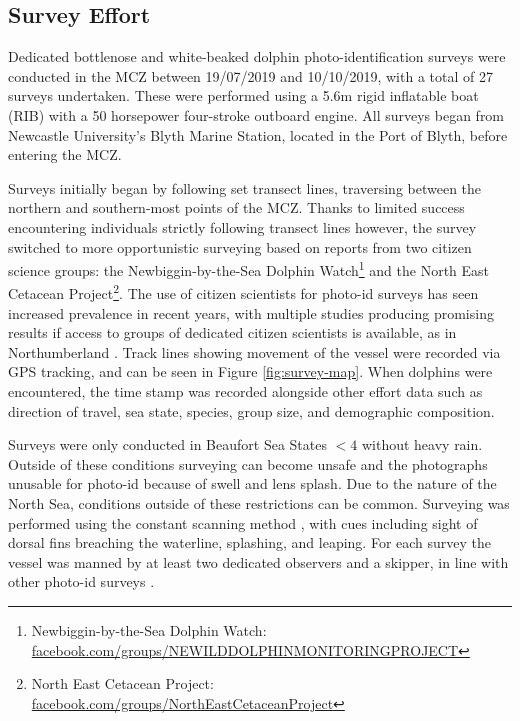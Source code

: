 \subsection{Survey Effort}\label{ch:NDD,sec:dataCollection,sub:surveyEffort}

Dedicated bottlenose and white-beaked dolphin photo-identification surveys were conducted in the MCZ between 19/07/2019 and 10/10/2019, with a total of 27 surveys undertaken. These were performed using a 5.6m rigid inflatable boat (RIB) with a 50 horsepower four-stroke outboard engine. All surveys began from Newcastle University's Blyth Marine Station, located in the Port of Blyth, before entering the MCZ.

Surveys initially began by following set transect lines, traversing between the northern and southern-most points of the MCZ. Thanks to limited success encountering individuals strictly following transect lines however, the survey switched to more opportunistic surveying based on reports from two citizen science groups: the Newbiggin-by-the-Sea Dolphin Watch\footnote{Newbiggin-by-the-Sea Dolphin Watch: \href{https://en-gb.facebook.com/groups/NEWILDDOLPHINMONITORINGPROJECT/}{facebook.com/groups/NEWILDDOLPHINMONITORINGPROJECT}} and the North East Cetacean Project\footnote{North East Cetacean Project: \href{https://en-gb.facebook.com/groups/NorthEastCetaceanProject/about/}{facebook.com/groups/NorthEastCetaceanProject}}. The use of citizen scientists for photo-id surveys has seen increased prevalence in recent years, with multiple studies producing promising results if access to groups of dedicated citizen scientists is available, as in Northumberland \cite{araujo_population_2017, currie_conservation_2018, armstrong_photographic_2019, araujo_photo-id_2019}. Track lines showing movement of the vessel were recorded via GPS tracking, and can be seen in Figure \ref{fig:survey-map}. When dolphins were encountered, the time stamp was recorded alongside other effort data such as direction of travel, sea state, species, group size, and demographic composition.

Surveys were only conducted in Beaufort Sea States $<4$ \cite{world_meteorologicial_society_beaufort_1970} without heavy rain. Outside of these conditions surveying can become unsafe and the photographs unusable for photo-id because of swell and lens splash. Due to the nature of the North Sea, conditions outside of these restrictions can be common. Surveying was performed using the constant scanning method \cite{mann_behavioral_1999}, with cues including sight of dorsal fins breaching the waterline, splashing, and leaping. For each survey the vessel was manned by at least two dedicated observers and a skipper, in line with other photo-id surveys \cite{sharpe_indian_2019, bessesen_lacaziosis-like_2014, silva_winter_2012}.

